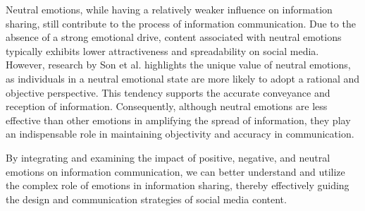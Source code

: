 Neutral emotions, while having a relatively weaker influence on information sharing, still contribute to the process of information communication. Due to the absence of a strong emotional drive, content associated with neutral emotions typically exhibits lower attractiveness and spreadability on social media. However, research by Son et al. \cite{son2022emotion} highlights the unique value of neutral emotions, as individuals in a neutral emotional state are more likely to adopt a rational and objective perspective. This tendency supports the accurate conveyance and reception of information. Consequently, although neutral emotions are less effective than other emotions in amplifying the spread of information, they play an indispensable role in maintaining objectivity and accuracy in communication. 

By integrating and examining the impact of positive, negative, and neutral emotions on information communication, we can better understand and utilize the complex role of emotions in information sharing, thereby effectively guiding the design and communication strategies of social media content.

